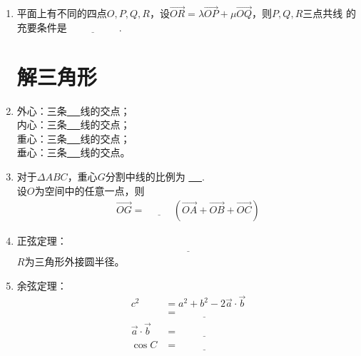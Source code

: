 \documentclass{article}
\newif\ifte
\renewcommand{\vec}{\overrightarrow}
\begin{document}
\begin{multicols}{2}
\begin{enumerate}[leftmargin=20pt]
\item 平面上有不同的四点$ O,P,Q,R $，设$ \vec{OR}=
\lambda \vec{OP}+\mu \vec{OQ} $，则$ P,Q,R $三点共线
的充要条件是$ \underline{\ \ifte \lambda+\mu=1
 \else \hspace{2cm} \fi\ } $. 


\section{解三角形}
\item 外心：三条\underline{\ \ifte 中垂\else \hspace{1.5cm} \fi\ }线的交点；\\
内心：三条\underline{\ \ifte 角平分\else \hspace{1.5cm} \fi\ }线的交点；\\
重心：三条\underline{\ \ifte 中\else \hspace{1.5cm} \fi\ }线的交点；\\
垂心：三条\underline{\ \ifte 垂\else \hspace{1.5cm} \fi\ }线的交点。

\item 对于$ \Delta ABC $，重心$ G $分割中线的比例为
\underline{\ \ifte 1:2\else \hspace{1cm} \fi\ }. \\
设$ O $为空间中的任意一点，则
\begin{align*}
    \vec{OG}=\underline{\ \ifte \dfrac{1}{3}
    \else \hspace{1cm} \fi\ } (\vec{OA}+\vec{OB}+\vec{OC})
\end{align*}

\item 正弦定理：
\begin{gather*}
    \underline{\ \ifte \dfrac{a}{\sin A}=\dfrac{b}{\sin B}=
        \dfrac{c}{\sin C} =2R \else \hspace{5cm} \fi\ }
\end{gather*}
$ R $为三角形外接圆半径。

\item 余弦定理：
\begin{align*}
    c^2 &=a^2+b^2-2\vec{a}\cdot\vec{b} \\
        &=\underline{\ \ifte a^2+b^2-2ab\cos C
          \else \hspace{2cm} \fi\ }  \\
    \vec{a}\cdot\vec{b} &=\underline{\ \ifte 
    \dfrac{a^2+b^2-c^2}{2} \else \hspace{2cm} \fi\ } \\
    \cos C &=\underline{\ \ifte 
        \dfrac{a^2+b^2-c^2}{2ab} \else \hspace{2cm} \fi\ }
\end{align*}


\end{enumerate}
\end{multicols}
\end{document}
